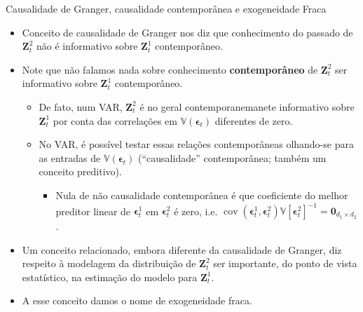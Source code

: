 \documentclass[11pt]{beamer}
\begin{document}
\begin{frame}{Causalidade de Granger, causalidade contemporânea e exogeneidade Fraca}
\begin{itemize}
	\item Conceito de causalidade de Granger nos diz que conhecimento do passado de $\boldsymbol{Z}^2_t$ não é informativo sobre $\boldsymbol{Z}^1_t$ contemporâneo.
	\item Note que não falamos nada sobre conhecimento \textbf{contemporâneo} de $\boldsymbol{Z}^2_t$ ser informativo sobre   $\boldsymbol{Z}^1_t$ contemporâneo.
	\begin{itemize}
		\item De fato, num VAR, $\boldsymbol{Z}^2_t$ é no geral contemporanemanete informativo sobre  $\boldsymbol{Z}^1_t$ por conta das correlações em $\mathbb{V}(\boldsymbol{\epsilon}_t)$ diferentes de zero.
		\item No VAR, é possível testar essas relações contemporâneas olhando-se para as entradas de $\mathbb{V}(\boldsymbol{\epsilon}_t)$ ({\color{blue}``causalidade'' contemporânea}; também um conceito preditivo). 
		\begin{itemize}
			\item 	Nula de não causalidade contemporânea é que coeficiente do melhor preditor linear de $\boldsymbol{\epsilon}_{t}^1$ em $\boldsymbol{\epsilon}_{t}^2$ é zero, i.e. $\operatorname{cov}(\boldsymbol{\epsilon}_t^1, \boldsymbol{\epsilon}_t^2)\mathbb{V}[\boldsymbol{\epsilon}_t^2]^{-1} = \boldsymbol{0}_{d_1 \times d_2}$.
		\end{itemize}
	
	\end{itemize}
	\item Um conceito relacionado, embora diferente da causalidade de Granger, diz respeito à modelagem da distribuição de $\boldsymbol{Z}^2_t$ ser importante, do ponto de vista estatístico, na estimação do modelo para $\boldsymbol{Z}^1_t$.
	\item A esse conceito damos o nome de {\color{blue}exogeneidade fraca}.
\end{itemize}
\end{frame}
\end{document}
